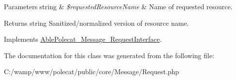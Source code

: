 \begin{DoxyParams}[1]{Parameters}
string & {\em \$requested\+Resource\+Name} & Name of requested resource.\\
\hline
\end{DoxyParams}
\begin{DoxyReturn}{Returns}
string Sanitized/normalized version of resource name. 
\end{DoxyReturn}


Implements \hyperlink{interface_able_polecat___message___request_interface_a1e05d92c1527e5fbe83db15156e54457}{Able\+Polecat\+\_\+\+Message\+\_\+\+Request\+Interface}.



The documentation for this class was generated from the following file\+:\begin{DoxyCompactItemize}
\item 
C\+:/wamp/www/polecat/public/core/\+Message/Request.\+php\end{DoxyCompactItemize}
